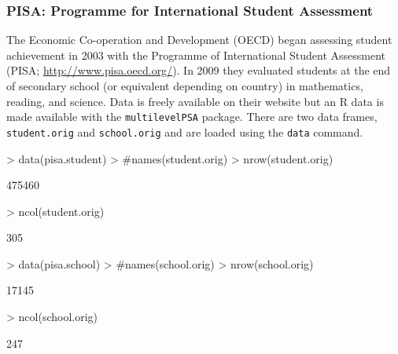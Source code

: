 \documentclass[10pt,slidestop,mathserif]{beamer}
\begin{document}
\begin{frame}
	\frametitle{PISA: Programme for International Student Assessment}
	The  Economic Co-operation and Development (OECD) began assessing student achievement in 2003 with the Programme of International Student Assessment (PISA; \url{http://www.pisa.oecd.org/}). In 2009 they evaluated students at the end of secondary school (or equivalent depending on country) in mathematics, reading, and science. Data is freely available on their website but an R data is made available with the \texttt{multilevelPSA} package. There are two data frames, \texttt{student.orig} and \texttt{school.orig} and are loaded using the \texttt{data} command.
\begin{Schunk}
\begin{Sinput}
> data(pisa.student)
> #names(student.orig)
> nrow(student.orig)
\end{Sinput}
\begin{Soutput}
[1] 475460
\end{Soutput}
\begin{Sinput}
> ncol(student.orig)
\end{Sinput}
\begin{Soutput}
[1] 305
\end{Soutput}
\begin{Sinput}
> data(pisa.school)
> #names(school.orig)
> nrow(school.orig)
\end{Sinput}
\begin{Soutput}
[1] 17145
\end{Soutput}
\begin{Sinput}
> ncol(school.orig)
\end{Sinput}
\begin{Soutput}
[1] 247
\end{Soutput}
\end{Schunk}
\end{frame}
\end{document}
